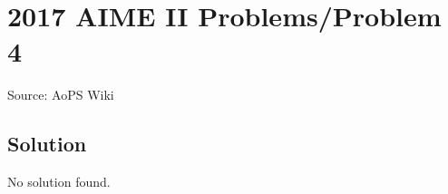 \documentclass[12pt]{article}
\begin{document}
\section*{{2017 AIME II Problems/Problem 4}}
Source: AoPS Wiki

\subsection*{Solution}
No solution found.
\end{document}
